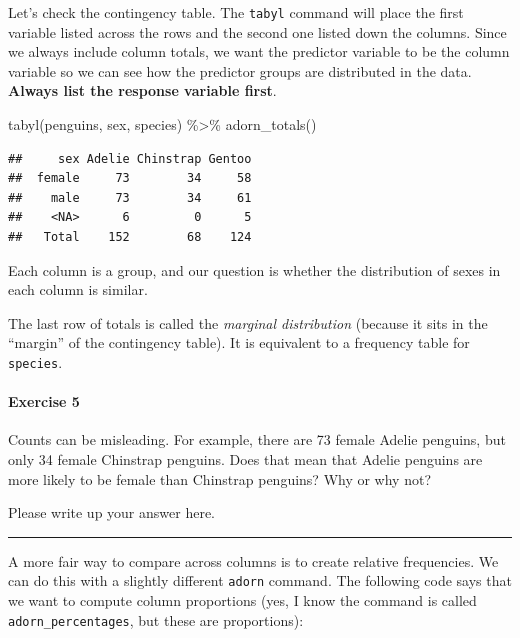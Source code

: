\documentclass[
]{book}
\newenvironment{Shaded}{\begin{snugshade}}{\end{snugshade}}
\newcommand{\FunctionTok}[1]{\textcolor[rgb]{0.00,0.00,0.00}{#1}}
\newcommand{\NormalTok}[1]{#1}
\newcommand{\SpecialCharTok}[1]{\textcolor[rgb]{0.00,0.00,0.00}{#1}}
\begin{document}
Let's check the contingency table. The \texttt{tabyl} command will place the first variable listed across the rows and the second one listed down the columns. Since we always include column totals, we want the predictor variable to be the column variable so we can see how the predictor groups are distributed in the data. \textbf{Always list the response variable first}.

\begin{Shaded}
\begin{Highlighting}[]
\FunctionTok{tabyl}\NormalTok{(penguins, sex, species) }\SpecialCharTok{\%\textgreater{}\%}
  \FunctionTok{adorn\_totals}\NormalTok{()}
\end{Highlighting}
\end{Shaded}

\begin{verbatim}
##     sex Adelie Chinstrap Gentoo
##  female     73        34     58
##    male     73        34     61
##    <NA>      6         0      5
##   Total    152        68    124
\end{verbatim}

Each column is a group, and our question is whether the distribution of sexes in each column is similar.

The last row of totals is called the \emph{marginal distribution} (because it sits in the ``margin'' of the contingency table). It is equivalent to a frequency table for \texttt{species}.

\hypertarget{exercise-5}{%
\paragraph{Exercise 5}\label{exercise-5}}

Counts can be misleading. For example, there are 73 female Adelie penguins, but only 34 female Chinstrap penguins. Does that mean that Adelie penguins are more likely to be female than Chinstrap penguins? Why or why not?

Please write up your answer here.

\begin{center}\rule{0.5\linewidth}{0.5pt}\end{center}

A more fair way to compare across columns is to create relative frequencies. We can do this with a slightly different \texttt{adorn} command. The following code says that we want to compute column proportions (yes, I know the command is called \texttt{adorn\_percentages}, but these are proportions):
\end{document}
